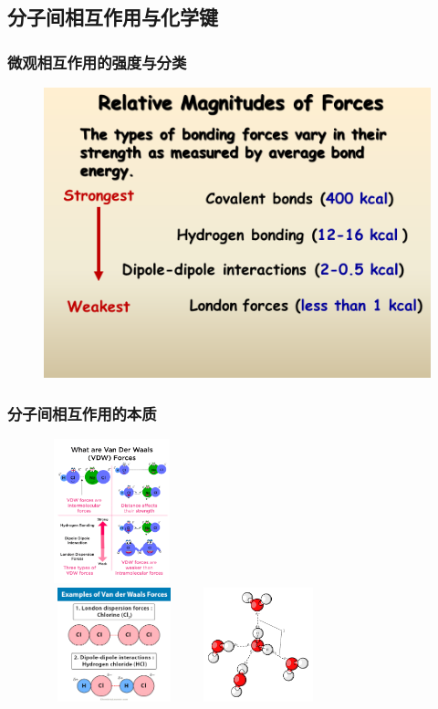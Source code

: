 \subsection{分子间相互作用与化学键}
\frame
{
	\frametitle{微观相互作用的强度与分类}
\begin{figure}[h!]
\centering
\vspace{-5.5pt}
\includegraphics[height=0.65\textwidth,width=1.05\textwidth,viewport=0 100 750 530,clip]{Figures/Bond-order.png}
\label{Bond-order}
\end{figure}
}

\frame
{
	\frametitle{分子间相互作用的本质}
\begin{figure}[h!]
\centering
\vspace{-10.5pt}
\includegraphics[height=1.65in ,width=1.55in,viewport=0 0 1150 1280,clip]{Figures/van_der_Waals-Force.png}\\
\includegraphics[height=1.30in,width=1.60in,viewport=0 25 600 530,clip]{Figures/Van-Der-Waals-Forces-Bond-Interactions-Examples.jpg}
\includegraphics[height=1.30in,width=1.60in,viewport=0 0 280 230,clip]{Figures/water-H-bond.png}
\label{van_der_Waalss}
\end{figure}
}

